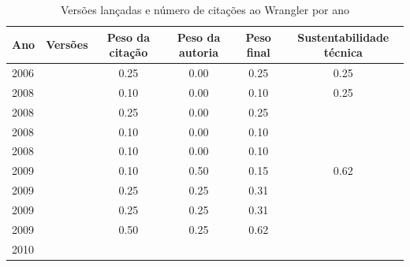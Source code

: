 \begin{table}[H]
\caption{Versões lançadas e número de citações ao Wrangler por ano}
\centering
\begin{tabular}{| l | c | c | c | c | c |}
  \hline
  Ano & Versões & Peso da citação & Peso da autoria & Peso final & Sustentabilidade técnica \\
  \hline
            2006
          &
          
          &
          0.25
          &
          0.00
          &
          0.25
          &
            {\color{red} 0.25}
          \\
\hline
            2008
          &
          
          &
          0.10
          &
          0.00
          &
          0.10
          &
            {\color{red} 0.25}
          \\
            2008
          &
          
          &
          0.25
          &
          0.00
          &
          0.25
          &
          \\
            2008
          &
          
          &
          0.10
          &
          0.00
          &
          0.10
          &
          \\
            2008
          &
          
          &
          0.10
          &
          0.00
          &
          0.10
          &
          \\
\hline
            2009
          &
          
          &
          0.10
          &
          0.50
          &
          0.15
          &
            {\color{blue} 0.62}
          \\
            2009
          &
          
          &
          0.25
          &
          0.25
          &
          0.31
          &
          \\
            2009
          &
          
          &
          0.25
          &
          0.25
          &
          0.31
          &
          \\
            2009
          &
          
          &
          0.50
          &
          0.25
          &
          0.62
          &
          \\
\hline
            2010
          &
          

\end{tabular}
\end{table}
